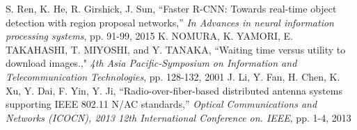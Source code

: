 \documentclass{ieeeaccess}
\begin{document}
\begin{thebibliography}{1}
 S. Ren, K. He, R. Girshick, J. Sun, ``Faster R-CNN: Towards
real-time object detection with region proposal networks,'' \emph{In Advances in neural information processing systems}, pp. 91-99, 2015
K. NOMURA, K. YAMORI, E. TAKAHASHI, T. MIYOSHI, and Y. TANAKA, ``Waiting time versus utility to download images.,"  \emph{4th Asia Pacific-Symposium on Information and Telecommunication Technologies}, pp. 128-132, 2001 
 J. Li, Y. Fan, H. Chen, K. Xu, Y. Dai, F. Yin, Y. Ji,  ``Radio-over-fiber-based distributed antenna systems supporting IEEE 802.11 N/AC standards,'' \emph{Optical Communications and Networks (ICOCN), 2013 12th International Conference on. IEEE}, pp. 1-4, 2013

\end{thebibliography}


\EOD
\end{document}
